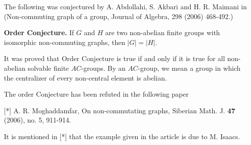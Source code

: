 \documentclass[12pt]{article}
\begin{document}
The following was  conjectured by A. Abdollahi, S. Akbari and H. R. Maimani
in (Non-commuting graph of a group, Journal of Algebra, 298 (2006) 468-492.)

{\bf Order Conjecture.} If  $G$ and
$H$ are two non-abelian finite groups with isomorphic non-commuting graphs, then $|G|=|H|$.

It was proved that  Order Conjecture is true if and only if it is true for all non-abelian solvable finite $AC$-groups.
By an $AC$-group, we mean a group in which the centralizer of every non-central element is abelian. 

The order Conjecture has been refuted in the following paper

[*] A. R. Moghaddamfar, On non-commutating graphs,  Siberian Math. J.  {\bf 47}  (2006),  no. 5, 911-914.

It is mentioned in [*] that the example given in the article is due to M. Isaacs. 


\end{document}
